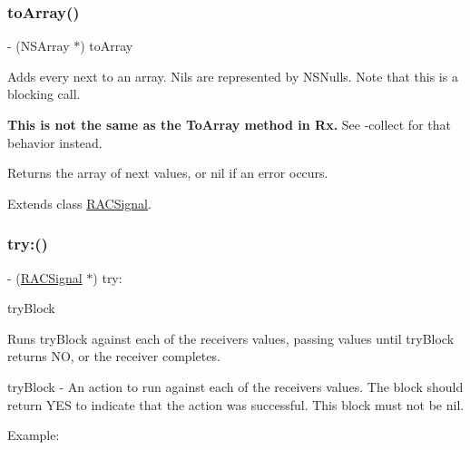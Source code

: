 \subsubsection{\texorpdfstring{to\+Array()}{toArray()}\hspace{0.1cm}{\footnotesize\ttfamily [3/3]}}
{\footnotesize\ttfamily -\/ (N\+S\+Array $\ast$) to\+Array \begin{DoxyParamCaption}{ }\end{DoxyParamCaption}}

Adds every {\ttfamily next} to an array. Nils are represented by N\+S\+Nulls. Note that this is a blocking call.

{\bfseries This is not the same as the {\ttfamily To\+Array} method in Rx.} See -\/collect for that behavior instead.

Returns the array of {\ttfamily next} values, or nil if an error occurs. 

Extends class \mbox{\hyperlink{interface_r_a_c_signal_a5b7a649ea4635f423b73cd4924652fe5}{R\+A\+C\+Signal}}.

\mbox{\label{category_r_a_c_signal_07_operations_08_ac65d7a1a19db9cb2f78c03781995bbe9}} 
\subsubsection{\texorpdfstring{try\+:()}{try:()}\hspace{0.1cm}{\footnotesize\ttfamily [1/3]}}
{\footnotesize\ttfamily -\/ (\mbox{\hyperlink{interface_r_a_c_signal}{R\+A\+C\+Signal}} $\ast$) try\+: \begin{DoxyParamCaption}\item[{(B\+O\+OL($^\wedge$)(id value, N\+S\+Error $\ast$$\ast$error\+Ptr))}]{try\+Block }\end{DoxyParamCaption}}

Runs {\ttfamily try\+Block} against each of the receiver\textquotesingle{}s values, passing values until {\ttfamily try\+Block} returns NO, or the receiver completes.

try\+Block -\/ An action to run against each of the receiver\textquotesingle{}s values. The block should return Y\+ES to indicate that the action was successful. This block must not be nil.

Example\+:

